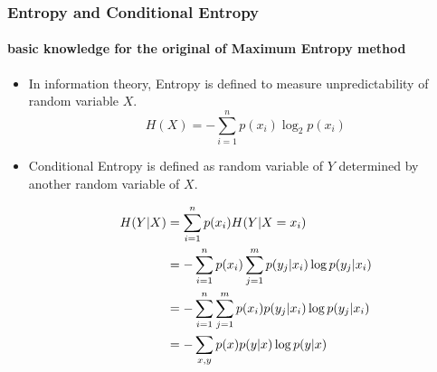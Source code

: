 \begin{frame}
\frametitle{Entropy and Conditional Entropy}
\framesubtitle{basic knowledge for the original of  Maximum Entropy method}
	\small	
	\begin{itemize}
		\item In information theory, Entropy is defined to measure unpredictability of random variable $X$.
		\begin{equation}
			H(X)=-\sum_{i=1}^{n}p(x_i)\log_2p(x_i)
		\end{equation}
		\item Conditional Entropy is defined as random variable of $Y$ determined by another random variable of $X$.
		\begin{scriptsize}
		\begin{equation}
			\begin{aligned}{\label{H(y)}}
			H(Y|X)&=\sum_{i=1}^{n}p(x_i)H(Y|X=x_i)\\
				  &=-\sum_{i=1}^{n}p(x_i)\sum_{j=1}^{m}p(y_j|x_i)\log p(y_j|x_i)\\
				  &=-\sum_{i=1}^{n}\sum_{j=1}^{m}p(x_i)p(y_j|x_i)\log p(y_j|x_i)\\
				  &=-\sum_{x,y}p(x)p(y|x)\log p(y|x)
			\end{aligned}
		\end{equation}
		\end{scriptsize}
	\end{itemize}
\end{frame}
